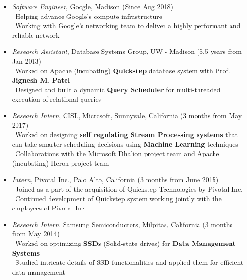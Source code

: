 \documentclass[11pt]{article}
\begin{document}
\begin{itemize}\addtolength{\itemsep}{-0.5\baselineskip}
	\item{\textit{Software Engineer}, Google, Madison \hfill (Since Aug 2018)}\\
		\textendash\ Helping advance Google's compute infrastructure \\
		\textendash\ Working with Google's networking team to deliver a highly performant and reliable network\\
	\item{\textit{Research Assistant}, Database Systems Group, UW - Madison \hfill (5.5 years from Jan 2013)}\\
		\textendash\ Worked on Apache (incubating) \textbf{Quickstep} database system with Prof. \textbf{Jignesh M. Patel} \\
		\textendash\ Designed and built a dynamic \textbf{Query Scheduler} for multi-threaded execution of relational queries \\
	\item{\textit{Research Intern}, CISL, Microsoft, Sunnyvale, California \hfill (3 months from May 2017)}\\
	\textendash\ Worked on designing \textbf{self regulating Stream Processing systems} that can take smarter scheduling decisions using \textbf{Machine Learning} techniques \\
	\textendash\ Collaborations with the Microsoft Dhalion project team and Apache (incubating) Heron project team\\
	\item{\textit{Intern}, Pivotal Inc., Palo Alto, California \hfill (3 months from June 2015)}\\
	\textendash\ Joined as a part of the acquisition of Quickstep Technologies by Pivotal Inc.\\
	\textendash\ Continued development of Quickstep system working jointly with the employees of Pivotal Inc.\\
	\item{\textit{Research Intern}, Samsung Semiconductors, Milpitas, California \hfill (3 months from May 2014)}\\
		\textendash\ Worked on optimizing \textbf{SSDs} (Solid-state drives) for \textbf{Data Management Systems} \\
		\textendash\ Studied intricate details of SSD functionalities and applied them for efficient data management \\

\end{itemize}
\end{document}
